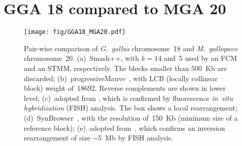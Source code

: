 \documentclass[a4paper,9pt]{extarticle}
\begin{document}
  


\clearpage
\section{GGA 18 compared to MGA 20}
\begin{figure}[!h]
  \centering
  \texttt{[image: fig/GGA18\_MGA20.pdf]}
  \caption{Pair-wise comparison of \textit{G.~gallus} chromosome~18 and \textit{M.~gallopavo} chromosome~20.
  (a)~Smash++, with $k=14$ and~5 used by an FCM and an STMM, respectively. The blocks smaller than 500~Kb are discarded;
  (b)~progressiveMauve~\cite{darling2010progressivemauve}, with LCB (locally collinear block) weight of~18692. Reverse complements are shown in lower level;
  (c)~adopted from \cite{zhang2011comparative}, which is confirmed by fluorescence \textit{in~situ hybridization} (FISH) analysis. The box shows a local rearrangement;
  (d)~SynBrowser~\cite{lee2016synteny}, with the resolution of~150~Kb (minimum size of a reference block);
  (e)~adopted from~\cite{dalloul2010multi}, which confirms an inversion rearrangement of size $\sim$5~Mb by FISH analysis.}
  \label{fig.supp.GGA18.MGA20}
\end{figure}

\clearpage
\end{document}
